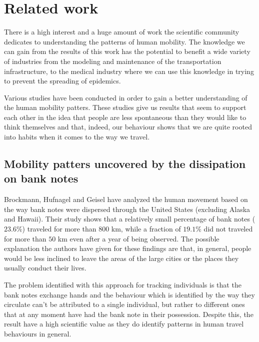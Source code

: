 \chapter{Related work}
\label{relatedwork}
There is a high interest and a huge amount of work the scientific community
dedicates to understanding the patterns of human mobility. The knowledge we can
gain from the results of this work has the potential to benefit a wide variety
of industries from the modeling and maintenance of the transportation
infrastructure, to the medical industry where we can use this knowledge in
trying to prevent the spreading of epidemics. \cite{Brockmann08} %

Various studies have been conducted in order to gain a better understanding of
the human mobility patters. These studies give us results that seem to support
each other in the idea that people are less spontaneous than they would like to
think themselves and that, indeed, our behaviour shows that we are quite rooted
into habits when it comes to the way we travel.

\section{Mobility patters uncovered by the dissipation on bank notes}
Brockmann, Hufnagel and Geisel\cite{Brockmann06} have analyzed the human movement
based on the way bank notes were dispersed through the United States (excluding
Alaska and Hawaii). Their study shows that a relatively small percentage of bank
notes ($23.6\%$) traveled for more than $800$ km, while a fraction of $19.1\%$
did not traveled for more than $50$ km even after a year of being observed. The
possible explanation the authors have given for these findings are that, in
general, people would be less inclined to leave the areas of the large cities or
the places they usually conduct their lives.

The problem identified with this approach for tracking individuals is that the
bank notes exchange hands and the behaviour which is identified by the way they
circulate can't be attributed to a single individual, but rather to different
ones that at any moment have had the bank note in their possession. Despite this,
the result have a high scientific value as they do identify patterns in human
travel behaviours in general.

